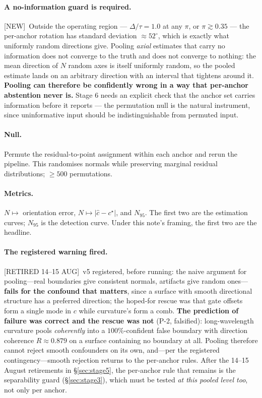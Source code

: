 \documentclass[11pt]{article}
\newcommand{\chat}{\hat{c}}
\newcommand{\provtag}[2]{{\footnotesize\sffamily\textcolor{#1}{[#2]}}}
\newcommand{\NEWT}{\provtag{newmag}{NEW}}
\newcommand{\RETIRED}{\provtag{limred}{RETIRED 14--15 AUG}}
\begin{document}
\paragraph{A no-information guard is required.} \NEWT\ Outside the operating region ---
$\Delta/\tau = 1.0$ at any $\pi$, or $\pi \gtrsim 0.35$ --- the per-anchor rotation has
standard deviation $\approx 52^\circ$, which is exactly what uniformly random directions
give. Pooling \emph{axial} estimates that carry no information does not converge to the
truth and does not converge to nothing: the mean direction of $N$ random axes is itself
uniformly random, so the pooled estimate lands on an arbitrary direction with an interval
that tightens around it. \textbf{Pooling can therefore be confidently wrong in a way that
per-anchor abstention never is.} Stage 6 needs an explicit check that the anchor set carries
information before it reports --- the permutation null is the natural instrument, since
uninformative input should be indistinguishable from permuted input.

\paragraph{Null.} Permute the residual-to-point assignment within each anchor and rerun the
pipeline. This randomises normals while preserving marginal residual distributions;
$\ge 500$ permutations.

\paragraph{Metrics.} $N \mapsto$ orientation error, $N \mapsto |\chat - c^\star|$, and $N_{95}$.
The first two are the estimation curves; $N_{95}$ is the detection curve. Under this note's
framing, the first two are the headline.

\paragraph{The registered warning fired.} \RETIRED\ v5 registered, before running: the naive
argument for pooling---real boundaries give consistent normals, artifacts give random
ones---\textbf{fails for the confound that matters}, since a surface with smooth directional
structure has a preferred direction; the hoped-for rescue was that gate offsets form a single
mode in $c$ while curvature's form a comb. \textbf{The prediction of failure was correct and
the rescue was not} (P-2, falsified): long-wavelength curvature pools \emph{coherently} into a
$100\%$-confident false boundary with direction coherence $R \approx 0.879$ on a surface
containing no boundary at all. Pooling therefore cannot reject smooth confounders on its own,
and---per the registered contingency---smooth rejection returns to the per-anchor rules. After
the 14--15 August retirements in \S\ref{sec:stage5}, the per-anchor rule that remains is the
separability guard (\S\ref{sec:stage3}), which must be tested \emph{at this pooled level too},
not only per anchor.
\end{document}
